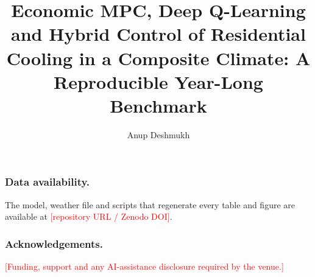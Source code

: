 \documentclass[runningheads]{llncs}
\begin{document}
\title{Economic MPC, Deep Q-Learning and Hybrid Control of Residential Cooling in a
Composite Climate: A Reproducible Year-Long Benchmark}

\author{Anup Deshmukh}

\maketitle

\begin{abstract}

\end{abstract}



\subsubsection*{Data availability.}
The model, weather file and scripts that regenerate every table and figure are
available at \textcolor{red}{[repository URL / Zenodo DOI]}.

\subsubsection*{Acknowledgements.}
\textcolor{red}{[Funding, support and any AI-assistance disclosure required by the
venue.]}



\end{document}
